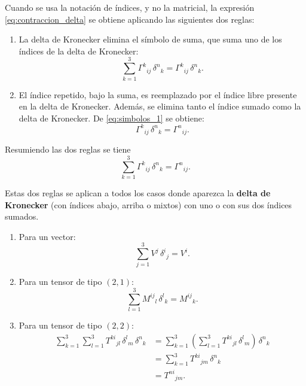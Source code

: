 \documentclass[../apunte_mecanica_clasica.tex]{subfiles}%
\begin{document}
\bigskip

Cuando se usa la notación de índices, y no la matricial, 
la expresión \eqref{eq:contraccion_delta} se obtiene aplicando 
las siguientes dos reglas:

\begin{enumerate}
    \item La delta de Kronecker elimina el símbolo de suma, 
    que suma uno de los índices de la delta de Kronecker:
    \begin{equation}\label{eq:simbolos_1}
        \sum_{k=1}^3 \Gamma^k{}_{ij}\,\delta^n{}_k 
        = \Gamma^k{}_{ij}\,\delta^n{}_k.
    \end{equation}

    \item El índice repetido, bajo la suma, es reemplazado por el 
    índice libre presente en la delta de Kronecker. Además, 
    se elimina tanto el índice sumado como la delta de Kronecker.  
    De \eqref{eq:simbolos_1} se obtiene:
    \begin{equation*}
        \Gamma^k{}_{ij}\,\delta^n{}_k = \Gamma^n{}_{ij}.
    \end{equation*}
\end{enumerate}

Resumiendo las dos reglas se tiene
\begin{equation*}
    \sum_{k=1}^3 \Gamma^k{}_{ij}\,\delta^n{}_k = \Gamma^n{}_{ij}.
\end{equation*}

\bigskip

Estas dos reglas se aplican a todos los casos donde aparezca la 
\textbf{delta de Kronecker} (con índices abajo, arriba o mixtos) 
con uno o con sus dos índices sumados.  

\begin{enumerate}
    \item Para un vector:
    \begin{equation*}
        \sum_{j=1}^3 V^j \,\delta^i{}_j = V^i.
    \end{equation*}

    \item Para un tensor de tipo $(2,1)$:
    \begin{equation*}
        \sum_{l=1}^3 M^{ij}{}_l \,\delta^l{}_k = M^{ij}{}_k.
    \end{equation*}

    \item Para un tensor de tipo $(2,2)$:
    \begin{align*}
        \sum_{k=1}^3 \sum_{l=1}^3 T^{ki}{}_{jl} \,\delta^l{}_m \,\delta^n{}_k
        &= \sum_{k=1}^3 \left( \sum_{l=1}^3 T^{ki}{}_{jl} \,\delta^l{}_m \right)\,\delta^n{}_k \\[6pt]
        &= \sum_{k=1}^3 T^{ki}{}_{jm} \,\delta^n{}_k \\[6pt]
        &= T^{ni}{}_{jm}.
    \end{align*}
\end{enumerate}
\end{document}
